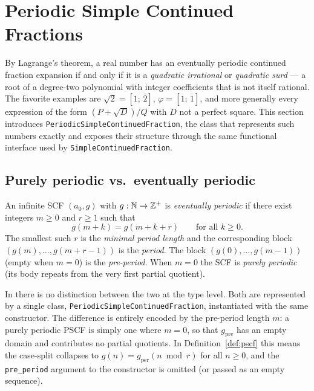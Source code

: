 \section{Periodic Simple Continued Fractions}

By Lagrange's theorem, a real number has an eventually periodic continued
fraction expansion if and only if it is a \emph{quadratic irrational} or \emph{quadratic surd} — a root
of a degree-two polynomial with integer coefficients that is not itself
rational. The favorite examples are $\sqrt{2} = [1;\,\overline{2}]$,
$\varphi = [1;\,\overline{1}]$, and more generally every expression of the
form $(P + \sqrt{D})/Q$ with $D$ not a perfect square.
This section introduces \texttt{PeriodicSimpleContinuedFraction}, the \catena
class that represents such numbers exactly and exposes their structure through
the same functional interface used by \texttt{SimpleContinuedFraction}.

\subsection{Purely periodic vs.\ eventually periodic}

\begin{definition}
  An infinite SCF $(a_0, g)$ with $g: \mathbb{N} \to \mathbb{Z}^+$ is
  \emph{eventually periodic} if there exist integers $m \geq 0$ and $r \geq 1$
  such that
  \[
    g(m + k) = g(m + k + r) \qquad \text{for all } k \geq 0.
  \]
  The smallest such $r$ is the \emph{minimal period length} and the
  corresponding block $(g(m), \ldots, g(m+r-1))$ is the \emph{period}.
  The block $(g(0), \ldots, g(m-1))$ (empty when $m = 0$) is the
  \emph{pre-period}.
  When $m = 0$ the SCF is \emph{purely periodic} (its body repeats from the
  very first partial quotient).
\end{definition}

In \catena there is no distinction between the two at the type level.
Both are represented by a single class, \texttt{PeriodicSimpleContinuedFraction},
instantiated with the same constructor.  The difference is entirely
encoded by the pre-period length $m$: a purely periodic PSCF is simply
one where $m = 0$, so that $g_{\mathrm{pre}}$ has an empty domain and
contributes no partial quotients.  In Definition~\ref{def:pscf} this means
the case-split collapses to $g(n) = g_{\mathrm{per}}(n \bmod r)$ for all
$n \geq 0$, and the \texttt{pre\_period} argument to the constructor is
omitted (or passed as an empty sequence).

